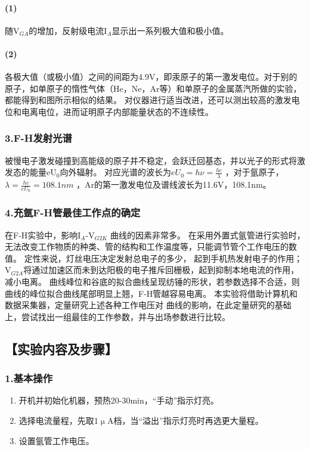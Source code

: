 \documentclass[12pt,a4paper,UTF8]{ctexart}
\begin{document}
	\paragraph{(1)}
	随V$_{GA}$的增加，反射级电流I$_A$显示出一系列极大值和极小值。
	\paragraph{(2)}
	各极大值（或极小值）之间的间距为4.9V，即汞原子的第一激发电位。对于别的原子，如单原子的惰性气体（He，Ne，Ar等）和单原子的金属蒸汽所做的实验，都能得到和图所示相似的结果。
	对仪器进行适当改进，还可以测出较高的激发电位和电离电位，进而证明原子内部能量状态的不连续性。

	\subsubsection*{3.F-H发射光谱}	
	被慢电子激发碰撞到高能级的原子并不稳定，会跃迁回基态，并以光子的形式将激发态的能量eU$_{0}$向外辐射。
	对应光谱的波长为$eU_{0} = h\nu =\frac {hc}{\lambda }$ ，对于氩原子，$\lambda = \frac {hc}{eU_{0}}=108.1nm$ ，Ar的第一激发电位及谱线波长为11.6V，108.1nm。

	\subsubsection*{4.充氩F-H管最佳工作点的确定}
	在F-H实验中，影响I$_{A}$-V$_{G2K}$ 曲线的因素非常多。
	在采用外置式氩管进行实验时，无法改变工作物质的种类、管的结构和工作温度等，只能调节管个工作电压的数值。
	定性来说，灯丝电压决定发射总电子的多少， 起到手机热发射电子的作用；V$_{G2A}$将通过加速区而未到达阳极的电子推斥回栅极，起到抑制本地电流的作用，减小电离。
	曲线峰位和谷底的拟合曲线呈现纺锤的形状，若参数选择不合适，则 曲线的峰位拟合曲线尾部明显上翘，F-H管越容易电离。
	本实验将借助计算机和数据采集器，定量研究上述各种工作电压对 曲线的影响，在此定量研究的基础上，尝试找出一组最佳的工作参数，并与出场参数进行比较。
\subsection*{【实验内容及步骤】}

	\subsubsection*{1.基本操作}
	\begin{enumerate}[(1)]
			\item 开机并初始化机器，预热20-30min，“手动”指示灯亮。
			\item 选择电流量程，先取1$\upmu$A档，当“溢出”指示灯亮时再选更大量程。
			\item 设置氩管工作电压。
	\end{enumerate}
\end{document}
